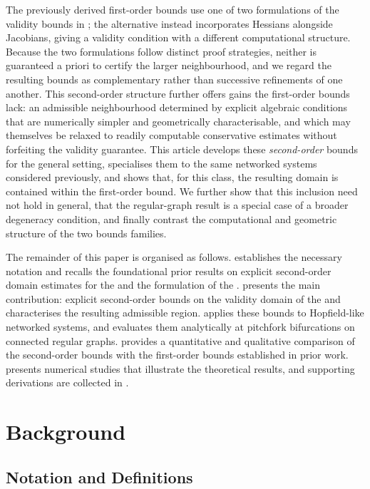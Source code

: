 \documentclass[a4paper]{cas-dc}
\begin{document}
The previously derived first-order bounds use one of two formulations of the \ImFT{} validity bounds in \cite{jindal2024estimates}; the alternative instead incorporates Hessians alongside Jacobians, giving a validity condition with a different computational structure. Because the two formulations follow distinct proof strategies, neither is guaranteed a priori to certify the larger neighbourhood, and we regard the resulting bounds as complementary rather than successive refinements of one another. This second-order structure further offers gains the first-order bounds lack: an admissible neighbourhood determined by explicit algebraic conditions that are numerically simpler and geometrically characterisable, and which may themselves be relaxed to readily computable conservative estimates without forfeiting the validity guarantee. This article develops these \emph{second-order} bounds for the general \LSR{} setting, specialises them to the same networked systems considered previously, and shows that, for this class, the resulting domain is contained within the first-order bound. We further show that this inclusion need not hold in general, that the regular-graph result is a special case of a broader degeneracy condition, and finally contrast the computational and geometric structure of the two bounds families.

The remainder of this paper is organised as follows.  establishes the necessary notation and recalls the foundational prior results on explicit second-order domain estimates for the \ImFT{} and the formulation of the \LSR{}.  presents the main contribution: explicit second-order bounds on the validity domain of the \LSR{} and characterises the resulting admissible region.  applies these bounds to Hopfield-like networked systems, and evaluates them analytically at pitchfork bifurcations on connected regular graphs.  provides a quantitative and qualitative comparison of the second-order bounds with the first-order bounds established in prior work.  presents numerical studies that illustrate the theoretical results, and supporting derivations are collected in .



\section{Background}
\label{sec:background}


\subsection{Notation and Definitions}
\label{ssec:notations}
\end{document}

